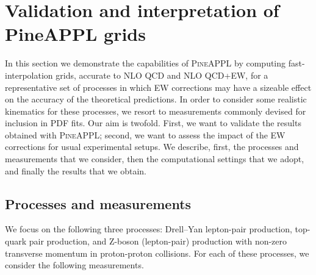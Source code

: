 \section{Validation and interpretation of PineAPPL grids}
\label{sec:results}

In this section we demonstrate the capabilities of \textsc{PineAPPL} by
computing fast-interpolation grids, accurate to NLO QCD and NLO QCD+EW,
for a representative set of processes in which EW corrections may have a
sizeable effect on the accuracy of the theoretical predictions.
In order to consider some realistic kinematics for these
processes, we resort to measurements commonly devised for inclusion in PDF
fits. Our aim is twofold. First, we want to validate the results
obtained with \textsc{PineAPPL}; second, we want to assess the
impact of the EW corrections for usual experimental setups. We describe, first,
the processes and measurements that we consider, then the computational
settings that we adopt, and finally the results that we obtain.

\subsection{Processes and measurements}
\label{subsec:processes_and_measurements}

We focus on the following three processes: Drell--Yan lepton-pair production,
top-quark pair production, and Z-boson (lepton-pair) production with non-zero
transverse momentum in proton-proton collisions. For each of these processes,
we consider the following measurements.

